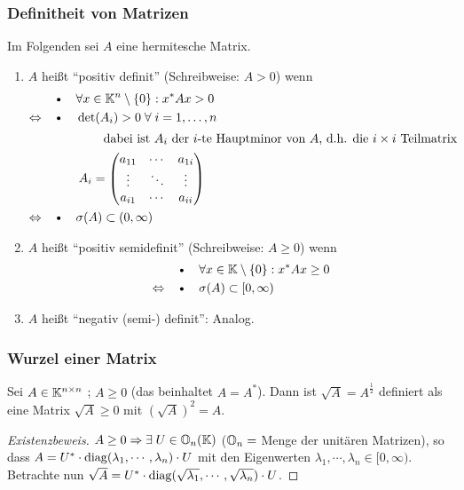 \subsubsection{Definitheit von Matrizen}
Im Folgenden sei $A$ eine hermitesche Matrix.
\begin{enumerate}
  \item [a)] $A$ heißt "`positiv definit"' (Schreibweise: $A > 0$) wenn
  \begin{align*}
    &\text{\textbullet} \quad \forall x \in \KK^n \setminus \{0\}: x^* A x > 0 \\
    \Leftrightarrow \quad &\text{\textbullet} \quad \det(A_i) > 0 \; \forall \; i = 1, \dots , n \\
    \intertext{\qquad \qquad \qquad dabei ist $A_i$ der $i$-te Hauptminor von $A$, d.h. die $i\times i$ Teilmatrix}
    & \quad \quad A_i =
    \begin{pmatrix}
      a_{11} & \cdots  & a_{1i} \\
      \vdots & \ddots & \vdots \\
      a_{i1} & \cdots & a_{ii}
    \end{pmatrix} \\
    \Leftrightarrow \quad &\text{\textbullet} \quad  \sigma (A) \subset (0, \infty)
  \end{align*}
  \item[b)]$A$ heißt "`positiv semidefinit"' (Schreibweise: $A \ge 0$) wenn
    \begin{align*}
    &\text{\textbullet} \quad \forall x \in \KK \setminus \{0\}: x^* A x \ge 0 \\
    \Leftrightarrow \quad &\text{\textbullet} \quad  \sigma (A) \subset [0, \infty)
  \end{align*}
  \item[c)] $A$ heißt "`negativ (semi-) definit"': Analog.
\end{enumerate}

\subsubsection{Wurzel einer Matrix}
Sei $A \in \mathbb K^{n \times n}$ ; $A \ge 0$ (das beinhaltet $A = A^*$). Dann ist
$\sqrt{A} = A^{\frac{1}{2}}$ definiert als eine Matrix $\sqrt{A} \ge 0$ mit
$\left(\sqrt{A} \right)^2 = A$.

\begin{proof}[Existenzbeweis]
$A \ge 0 \Rightarrow \exists \; U \in \mathbb O_n(\mathbb K)$ ($\mathbb O_n = $ Menge
der unitären Matrizen), so dass  \newline
$A = U^* \cdot \operatorname*{\mathrm{diag}}(\lambda_1, \cdots , \lambda_n) \cdot U$ mit den Eigenwerten
$\lambda_1, \cdots , \lambda_n \in [0, \infty)$. \newline
Betrachte nun $\sqrt{A} = U^* \cdot \operatorname*{\mathrm{diag}}(\sqrt{\lambda_1}, \cdots , \sqrt{\lambda_n}) \cdot U$.
\end{proof}

